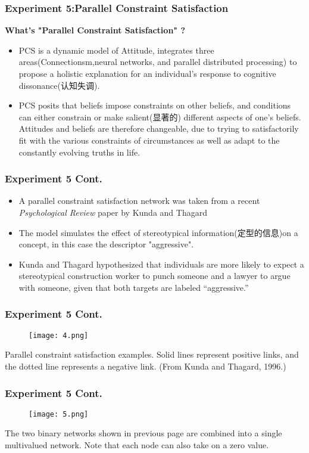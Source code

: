 \documentclass[CJK]{beamer}
\begin{document}
\begin{CJK*}{GBK}{song}
\begin{frame}
\frametitle{Experiment 5:Parallel Constraint Satisfaction}
\textbf{What's "Parallel Constraint Satisfaction" ?}
\begin{itemize}
\item{\textcolor[rgb]{0.00,0.50,1.00}{PCS is a dynamic model of Attitude, integrates three areas(Connectionsm,neural networks, and parallel distributed processing) to propose a holistic explanation for an individual's response to cognitive dissonance(认知失调).
}}
\item{\textcolor[rgb]{0.00,0.50,1.00}{PCS posits that beliefs impose constraints on other beliefs, and conditions can either constrain or make salient(显著的) different aspects of one’s beliefs. Attitudes and beliefs are therefore changeable, due to trying to satisfactorily fit with the various constraints of circumstances as well as adapt to the constantly evolving truths in life.
}}
\end{itemize}
\end{frame}
\begin{frame}
\frametitle{Experiment 5 Cont.}
\begin{itemize}
\item{A parallel constraint satisfaction network was taken from a recent \emph{Psychological Review} paper by Kunda and Thagard}
\item{The model simulates the effect of stereotypical information(定型的信息)on a concept, in this case the descriptor "aggressive".}
\item{Kunda and Thagard hypothesized
that \textcolor[rgb]{0.00,0.50,1.00}{individuals are more likely to expect a stereotypical
construction worker to punch someone and a lawyer to argue with someone,
given that both targets are labeled “aggressive.”}}
\end{itemize}
\end{frame}
\begin{frame}
\frametitle{Experiment 5 Cont.}
\begin{figure}
\texttt{[image: 4.png]}
\end{figure}
{\tiny Parallel constraint satisfaction examples. Solid lines represent positive links, and the
dotted line represents a negative link. (From Kunda and Thagard, 1996.)}
\end{frame}
\begin{frame}
\frametitle{Experiment 5 Cont.}
\begin{figure}
\texttt{[image: 5.png]}
\end{figure}
{\tiny The two binary networks shown in previous page are combined into a single multivalued
network. Note that each node can also take on a zero value.}
\end{frame}


\end{CJK*}
\end{document}

